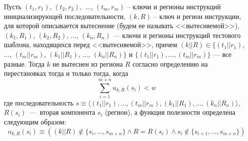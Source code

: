 \begin{theorem}\label{correct_mirror_LRU} Пусть $(t_1, r_1)$, $(t_2,r_2),$ ..., $(t_m,r_m)$ -- ключи и регионы инструкций инициализирующей последовательности, $(k, R)$ -- ключ и регион инструкции, для которой описывается вытеснение (будем ее называть <<вытесняемой>>), $(k_1,R_1)$, $(k_2,R_2)$, ..., $(k_n,R_n)$ --- ключи и регионы инструкций тестового шаблона, находящихся перед <<вытесняемой>>, причем $(k||R) \in \{(t_1||r_1)$, ..., $(t_m||r_m)$, $(k_1||R_1)$, ..., $(k_n||R_n)\}$ и $\{(t_1||r_1), ...,(t_m||r_m)\}$ --- все разные. Тогда $k$ не вытеснен из региона $R$ согласно определению на перестановках тогда и только тогда, когда $$\sum\limits_{i=1}^{m+n} u_{k,R}(s_i) < w$$
где последовательность $s \equiv \langle (t_1||r_1), ..., (t_m||r_m), (k_1||R_1), ..., (k_n||R_n)\rangle$, $R(s_i)$~---~вторая компонента $s_i$ (регион), а функция полезности определена следующим образом:
$$u_{k,R}(s_i) \equiv ((k||R) \notin \{s_i, ..., s_{m+n}\} \wedge
R = R(s_i) \wedge s_i \notin\{s_{i+1},..., s_{m+n}\})$$


\end{theorem}

